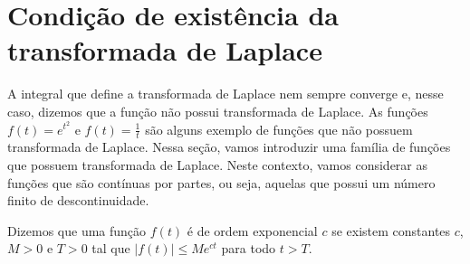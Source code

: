 \section{Condição de existência da transformada de Laplace}
A integral que define a transformada de Laplace nem sempre converge e, nesse caso, dizemos que a função não possui transformada de Laplace. As funções $f(t)=e^{t^2}$ e $f(t)=\frac{1}{t}$ são alguns exemplo de funções que não possuem transformada de Laplace. Nessa seção, vamos introduzir uma família de funções que possuem transformada de Laplace. Neste contexto, vamos considerar as funções que são contínuas por partes, ou seja, aquelas que possui um número finito de descontinuidade.
\begin{defn}Dizemos que uma função $f(t)$ é de ordem exponencial $c$ se existem constantes $c$, $M>0$ e $T>0$ tal que $|f(t)|\leq M e^{ct}$ para todo $t>T$. 
\end{defn}
